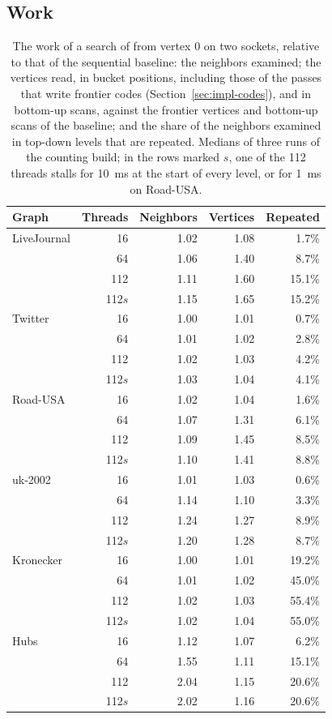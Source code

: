\subsection{Work}
\label{sec:exp-work}

\begin{table}
    \caption{The work of a search of \wfdo from vertex 0 on two sockets, relative to that of the sequential baseline: the neighbors examined; the vertices read, in bucket positions, including those of the passes that write frontier codes (Section~\ref{sec:impl-codes}), and in bottom-up scans, against the frontier vertices and bottom-up scans of the baseline; and the share of the neighbors examined in top-down levels that are repeated. Medians of three runs of the counting build; in the rows marked $s$, one of the 112 threads stalls for 10~ms at the start of every level, or for 1~ms on Road-USA.}
    \label{tab:work}
    \small
    \begin{tabular}{l r r r r}
        \toprule
        Graph & Threads & Neighbors & Vertices & Repeated \\
        \midrule
        LiveJournal & 16 & 1.02 & 1.08 & 1.7\% \\
        & 64 & 1.06 & 1.40 & 8.7\% \\
        & 112 & 1.11 & 1.60 & 15.1\% \\
        & 112$s$ & 1.15 & 1.65 & 15.2\% \\
        Twitter & 16 & 1.00 & 1.01 & 0.7\% \\
        & 64 & 1.01 & 1.02 & 2.8\% \\
        & 112 & 1.02 & 1.03 & 4.2\% \\
        & 112$s$ & 1.03 & 1.04 & 4.1\% \\
        Road-USA & 16 & 1.02 & 1.04 & 1.6\% \\
        & 64 & 1.07 & 1.31 & 6.1\% \\
        & 112 & 1.09 & 1.45 & 8.5\% \\
        & 112$s$ & 1.10 & 1.41 & 8.8\% \\
        uk-2002 & 16 & 1.01 & 1.03 & 0.6\% \\
        & 64 & 1.14 & 1.10 & 3.3\% \\
        & 112 & 1.24 & 1.27 & 8.9\% \\
        & 112$s$ & 1.20 & 1.28 & 8.7\% \\
        Kronecker & 16 & 1.00 & 1.01 & 19.2\% \\
        & 64 & 1.01 & 1.02 & 45.0\% \\
        & 112 & 1.02 & 1.03 & 55.4\% \\
        & 112$s$ & 1.02 & 1.04 & 55.0\% \\
        Hubs & 16 & 1.12 & 1.07 & 6.2\% \\
        & 64 & 1.55 & 1.11 & 15.1\% \\
        & 112 & 2.04 & 1.15 & 20.6\% \\
        & 112$s$ & 2.02 & 1.16 & 20.6\% \\
        \bottomrule
    \end{tabular}
\end{table}

